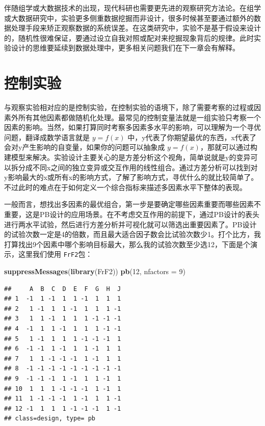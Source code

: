 \documentclass[]{tufte-book}
\newenvironment{Shaded}{}{}
\newcommand{\DataTypeTok}[1]{\textcolor[rgb]{0.56,0.13,0.00}{#1}}
\newcommand{\DecValTok}[1]{\textcolor[rgb]{0.25,0.63,0.44}{#1}}
\newcommand{\KeywordTok}[1]{\textcolor[rgb]{0.00,0.44,0.13}{\textbf{#1}}}
\newcommand{\NormalTok}[1]{#1}
\begin{document}
伴随组学或大数据技术的出现，现代科研也需要更先进的观察研究方法论。在组学或大数据研究中，实验更多侧重数据挖掘而非设计，很多时候甚至要通过额外的数据处理手段来矫正观察数据的系统误差。在这类研究中，实验不是基于假设来设计的，随机性很难保证，要通过设立自我对照或配对来挖掘现象背后的规律。此时实验设计的思维要延续到数据处理中，更多相关问题我们在下一章会有解释。

\hypertarget{ux63a7ux5236ux5b9eux9a8c}{%
\section{控制实验}\label{ux63a7ux5236ux5b9eux9a8c}}

与观察实验相对应的是控制实验，在控制实验的语境下，除了需要考察的过程或因素外所有其他因素都做随机化处理。最常见的控制变量法就是一组实验只考察一个因素的影响。当然，如果打算同时考察多因素多水平的影响，可以理解为一个寻优问题，翻译成数学语言就是 \(y = f(x)\) 中，y代表了你期望最优的东西，x代表了会对y产生影响的自变量，如果你的问题可以抽象成 \(y = f(x)\)，那就可以通过构建模型来解决。实验设计主要关心的是方差分析这个视角，简单说就是y的变异可以拆分成不同x之间的独立变异或交互作用的线性组合。通过方差分析可以找到对y影响最大的x或所有x的影响方式，了解了影响方式，寻优什么的就比较简单了。不过此时的难点在于如何定义一个综合指标来描述多因素水平下整体的表现。

一般而言，想找出多因素的最优组合，第一步是要确定哪些因素重要而哪些因素不重要，这是PB设计的应用场景。在不考虑交互作用的前提下，通过PB设计的表头进行两水平试验，然后进行方差分析并可视化就可以筛选出重要因素了。PB设计的试验次数一定是4的倍数，而且最大适合因子数会比试验次数少1。打个比方，我打算找出9个因素中哪个影响目标最大，那么我的试验次数至少选12，下面是个演示，这里我们使用 \texttt{FrF2}包：

\begin{Shaded}
\begin{Highlighting}[]
\KeywordTok{suppressMessages}\NormalTok{(}\KeywordTok{library}\NormalTok{(FrF2))}
\KeywordTok{pb}\NormalTok{(}\DecValTok{12}\NormalTok{, }\DataTypeTok{nfactors =} \DecValTok{9}\NormalTok{)}
\end{Highlighting}
\end{Shaded}

\begin{verbatim}
##     A  B  C  D  E  F  G  H  J
## 1  -1  1 -1  1  1 -1  1  1  1
## 2   1 -1  1  1 -1  1  1  1 -1
## 3   1  1 -1  1  1  1 -1 -1 -1
## 4  -1  1  1 -1  1  1  1 -1 -1
## 5   1 -1  1  1  1 -1 -1 -1  1
## 6  -1 -1  1 -1  1  1 -1  1  1
## 7   1  1 -1 -1 -1  1 -1  1  1
## 8  -1 -1 -1 -1 -1 -1 -1 -1 -1
## 9  -1 -1 -1  1 -1  1  1 -1  1
## 10  1  1  1 -1 -1 -1  1 -1  1
## 11  1 -1 -1 -1  1 -1  1  1 -1
## 12 -1  1  1  1 -1 -1 -1  1 -1
## class=design, type= pb
\end{verbatim}
\end{document}
